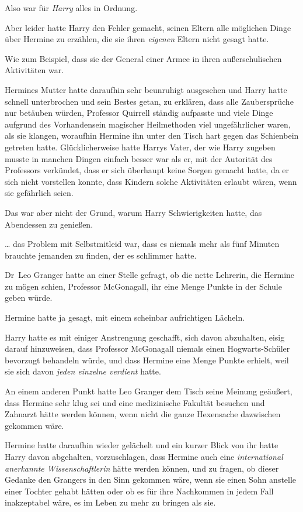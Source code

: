 {Also war für \emph{Harry} alles in Ordnung.

Aber leider hatte Harry den Fehler gemacht, seinen Eltern alle möglichen Dinge über Hermine zu erzählen, die sie ihren \emph{eigenen} Eltern nicht gesagt hatte.

Wie zum Beispiel, dass sie der General einer Armee in ihren außerschulischen Aktivitäten war.

Hermines Mutter hatte daraufhin sehr beunruhigt ausgesehen und Harry hatte schnell unterbrochen und sein Bestes getan, zu erklären, dass alle Zaubersprüche nur betäuben würden, Professor Quirrell ständig aufpasste und viele Dinge aufgrund des Vorhandensein magischer Heilmethoden viel ungefährlicher waren, als sie klangen, woraufhin Hermine ihn unter den Tisch hart gegen das Schienbein getreten hatte. Glücklicherweise hatte Harrys Vater, der wie Harry zugeben musste in manchen Dingen einfach besser war als er, mit der Autorität des Professors verkündet, dass er sich überhaupt keine Sorgen gemacht hatte, da er sich nicht vorstellen konnte, dass Kindern solche Aktivitäten erlaubt wären, wenn sie gefährlich seien.

Das war aber nicht der Grund, warum Harry Schwierigkeiten hatte, das Abendessen zu genießen.

… das Problem mit Selbstmitleid war, dass es niemals mehr als fünf Minuten brauchte jemanden zu finden, der es schlimmer hatte.

Dr~Leo Granger hatte an einer Stelle gefragt, ob die nette Lehrerin, die Hermine zu mögen schien, Professor McGonagall, ihr eine Menge Punkte in der Schule geben würde.

Hermine hatte ja gesagt, mit einem scheinbar aufrichtigen Lächeln.

Harry hatte es mit einiger Anstrengung geschafft, sich davon abzuhalten, eisig darauf hinzuweisen, dass Professor McGonagall niemals einen Hogwarts-Schüler bevorzugt behandeln würde, und dass Hermine eine Menge Punkte erhielt, weil sie sich davon \emph{jeden einzelne verdient} hatte.

An einem anderen Punkt hatte Leo Granger dem Tisch seine Meinung geäußert, dass Hermine sehr klug sei und eine medizinische Fakultät besuchen und Zahnarzt hätte werden können, wenn nicht die ganze Hexensache dazwischen gekommen wäre.

Hermine hatte daraufhin wieder gelächelt und ein kurzer Blick von ihr hatte Harry davon abgehalten, vorzuschlagen, dass Hermine auch eine \emph{international anerkannte Wissenschaftlerin} hätte werden können, und zu fragen, ob dieser Gedanke den Grangers in den Sinn gekommen wäre, wenn sie einen Sohn anstelle einer Tochter gehabt hätten oder ob es für ihre Nachkommen in jedem Fall inakzeptabel wäre, es im Leben zu mehr zu bringen als sie.

}
